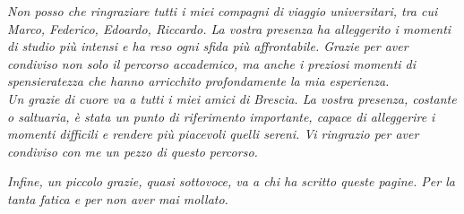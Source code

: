 \;

\emph{Non posso che ringraziare tutti i miei compagni di viaggio universitari, tra cui Marco, Federico, Edoardo, Riccardo. La vostra presenza ha alleggerito i momenti di studio più intensi e ha reso ogni sfida più affrontabile. Grazie per aver condiviso non solo il percorso accademico, ma anche i preziosi momenti di spensieratezza che hanno arricchito profondamente la mia esperienza.
\noindent\\
Un grazie di cuore va a tutti i miei amici di Brescia. La vostra presenza, costante o saltuaria, è stata un punto di riferimento importante, capace di alleggerire i momenti difficili e rendere più piacevoli quelli sereni. Vi ringrazio per aver condiviso con me un pezzo di questo percorso.
}

\vspace{2em}

\emph{Infine, un piccolo grazie, quasi sottovoce, va a chi ha scritto queste pagine. Per la tanta fatica e per non aver mai mollato.}